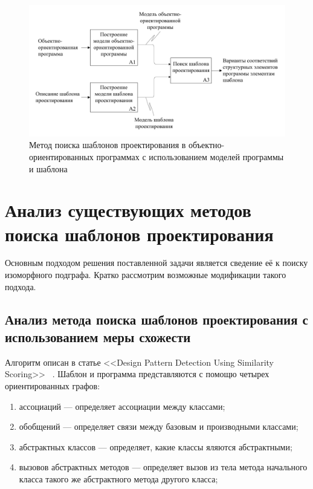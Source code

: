 \begin{figure}
\centering
\includegraphics[width=\textwidth]{inc/idef0-general.pdf}
\caption{Метод поиска шаблонов проектирования в объектно-ориентированных программах с использованием моделей программы и шаблона}
\label{fig:idef0-general}
\end{figure}

\section{Анализ существующих методов поиска шаблонов проектирования}

Основным подходом решения поставленной задачи является сведение её к поиску
изоморфного подграфа.
Кратко рассмотрим возможные модификации такого подхода.

\subsection{Анализ метода поиска шаблонов проектирования с использованием меры схожести}

Алгоритм описан в статье <<Design Pattern Detection Using Similarity Scoring>>
~\cite{DesignPatternSimilarityScoring}.
Шаблон и программа представляются с помощю четырех ориентированных графов:
\begin{enumerate}
\item ассоциаций --- определяет ассоциации между классами;
\item обобщений --- определяет связи между базовым и производными классами;
\item абстрактных классов --- определяет, какие классы яляются абстрактными;
\item вызовов абстрактных методов --- определяет вызов из тела метода начального
класса такого же абстрактного метода другого класса;
\end{enumerate}

